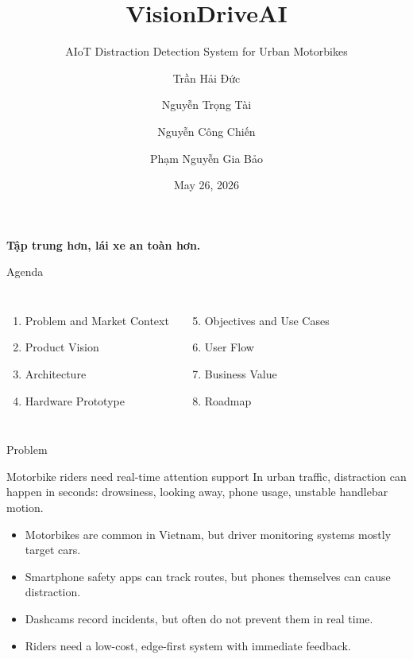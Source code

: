 \documentclass[aspectratio=169]{beamer}
\title[VisionDriveAI]{VisionDriveAI}
\subtitle{AIoT Distraction Detection System for Urban Motorbikes}
\author{Trần Hải Đức \and Nguyễn Trọng Tài \and Nguyễn Công Chiến \and Phạm Nguyễn Gia Bảo}
\institute{Faculty of Information Technology \\ University of Science}
\date{May 26, 2026}
\begin{document}
\begin{frame}
  \titlepage
  \vspace{-0.4cm}
  \begin{center}
    \textbf{Tập trung hơn, lái xe an toàn hơn.}
  \end{center}
\end{frame}

\begin{frame}{Agenda}
  \begin{columns}
    \begin{enumerate}
      \item Problem and Market Context
      \item Product Vision
      \item Architecture
      \item Hardware Prototype
    \end{enumerate}
    \begin{enumerate}
      \setcounter{enumi}{4}
      \item Objectives and Use Cases
      \item User Flow
      \item Business Value
      \item Roadmap
    \end{enumerate}
  \end{columns}
\end{frame}

\begin{frame}{Problem}
  \begin{block}{Motorbike riders need real-time attention support}
    In urban traffic, distraction can happen in seconds: drowsiness, looking away, phone usage, unstable handlebar motion.
  \end{block}
  \begin{itemize}
    \item Motorbikes are common in Vietnam, but driver monitoring systems mostly target cars.
    \item Smartphone safety apps can track routes, but phones themselves can cause distraction.
    \item Dashcams record incidents, but often do not prevent them in real time.
    \item Riders need a low-cost, edge-first system with immediate feedback.
  \end{itemize}
\end{frame}
\end{document}
